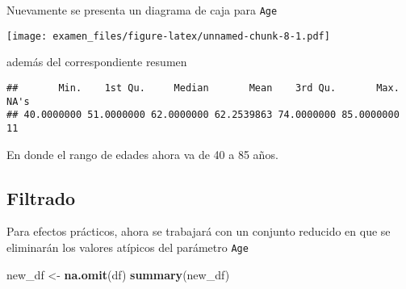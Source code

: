 \documentclass[
  10pt,
  spanish,
]{article}
\newenvironment{Shaded}{\begin{snugshade}}{\end{snugshade}}
\newcommand{\DataTypeTok}[1]{\textcolor[rgb]{0.13,0.29,0.53}{#1}}
\newcommand{\KeywordTok}[1]{\textcolor[rgb]{0.13,0.29,0.53}{\textbf{#1}}}
\newcommand{\NormalTok}[1]{#1}
\newcommand{\OperatorTok}[1]{\textcolor[rgb]{0.81,0.36,0.00}{\textbf{#1}}}
\newcommand{\StringTok}[1]{\textcolor[rgb]{0.31,0.60,0.02}{#1}}
\begin{document}
Nuevamente se presenta un diagrama de caja para \texttt{Age}

\begin{Shaded}
\end{Shaded}

\texttt{[image: examen\_files/figure-latex/unnamed-chunk-8-1.pdf]}

además del correspondiente resumen

\begin{Shaded}
\end{Shaded}

\begin{verbatim}
##       Min.    1st Qu.     Median       Mean    3rd Qu.       Max.       NA's 
## 40.0000000 51.0000000 62.0000000 62.2539863 74.0000000 85.0000000         11
\end{verbatim}

En donde el rango de edades ahora va de 40 a 85 años.

\hypertarget{filtrado}{%
\subsection{Filtrado}\label{filtrado}}

Para efectos prácticos, ahora se trabajará con un conjunto reducido en
que se eliminarán los valores atípicos del parámetro \texttt{Age}

\begin{Shaded}
\begin{Highlighting}[]
\NormalTok{new\_df \textless{}{-}}\StringTok{ }\KeywordTok{na.omit}\NormalTok{(df)}
\KeywordTok{summary}\NormalTok{(new\_df)}
\end{Highlighting}
\end{Shaded}
\end{document}
